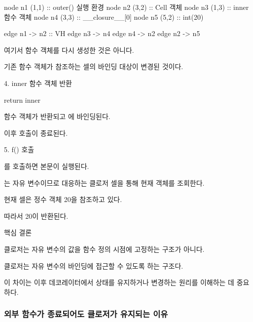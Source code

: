\begin{dhkdiagram}[in=2]
node n1 (1,1) :: outer() 실행 환경
node n2 (3,2) :: Cell 객체
node n3 (1,3) :: inner 함수 객체
node n4 (3,3) :: __closure__[0]
node n5 (5,2) :: int(20)

edge n1 -> n2 :: VH
edge n3 -> n4 
edge n4 -> n2
edge n2 -> n5
\end{dhkdiagram}

여기서  함수 객체를 다시 생성한 것은 아니다.

기존 함수 객체가 참조하는 셀의 바인딩 대상이 변경된 것이다.

\begin{dhknote}
\begin{dhksmry}[centered]
4. inner 함수 객체 반환
\end{dhksmry}
\end{dhknote}

\begin{dhkcode}
return inner
\end{dhkcode}

 함수 객체가 반환되고 에 바인딩된다.

이후  호출이 종료된다.

\begin{dhknote}
\begin{dhksmry}[centered]
5. f() 호출
\end{dhksmry}
\end{dhknote}

를 호출하면  본문이 실행된다.


는 자유 변수이므로 대응하는 클로저 셀을 통해 현재 객체를 조회한다.

현재 셀은 정수 객체 20을 참조하고 있다.

따라서 20이 반환된다.

\begin{dhknote}
\begin{dhksmry}[centered]
핵심 결론
\end{dhksmry}
\end{dhknote}

클로저는 자유 변수의 값을 함수 정의 시점에 고정하는 구조가 아니다.

클로저는 자유 변수의 바인딩에 접근할 수 있도록 하는 구조다.

이 차이는 이후 데코레이터에서 상태를 유지하거나 변경하는 원리를 이해하는 데 중요하다.

\subsubsection{외부 함수가 종료되어도 클로저가 유지되는 이유}

